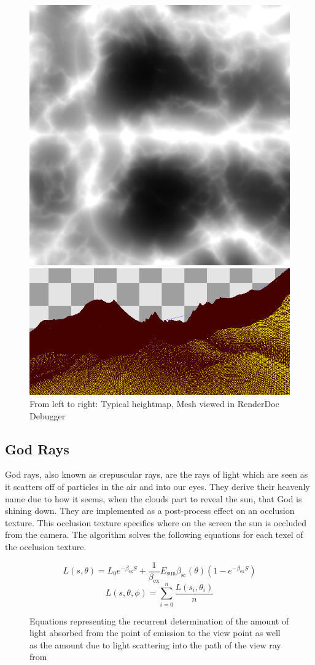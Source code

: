 \documentclass[10pt, openany]{book}
\begin{document}
\begin{figure}[H]
	\centering
	\begin{minipage}{.35\textwidth}
		\centering
	  	\includegraphics[width=.6\linewidth]{ridged-noise}
	\end{minipage}%
	\begin{minipage}{.65\textwidth}
	  	\centering
	  	\includegraphics[width=.6\linewidth]{mesh}
	\end{minipage}
	\caption{From left to right: Typical heightmap, Mesh viewed in RenderDoc Debugger}
\end{figure}

\subsection{God Rays}

God rays, also known as crepuscular rays, are the rays of light which are seen as it scatters off of particles in the air and into our eyes. They derive their heavenly name due to how it seems, when the clouds part to reveal the sun, that God is shining down. They are implemented as a post-process effect on an occlusion texture. This occlusion texture specifies where on the screen the sun is occluded from the camera. The algorithm solves the following equations for each texel of the occlusion texture.

\begin{figure}[H]
	\centering
	\[L(s,\theta) = L_{0}e^{-\beta_{\text{ex}}S} + \frac{1}{\beta_{\text{ex}}}E_{\text{sun}}\beta_{\text{sc}}(\theta)(1-e^{-\beta_{\text{ex}}S})\]
	\[L(s,\theta,\phi) = \sum_{i=0}^{n}\frac{L(s_i,\theta_i)}{n}\]
	\caption{Equations representing the recurrent determination of the amount of light absorbed from the point of emission to the view point as well as the amount due to light scattering into the path of the view ray from \citep{gpugems3}}
\end{figure}
\end{document}
